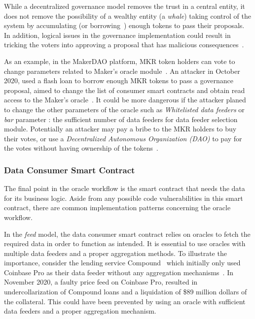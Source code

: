 While a decentralized governance model removes the trust in a central entity, it does not remove the possibility of a wealthy entity (a \emph{whale}) taking control of the system by accumulating (or borrowing~\cite{qin2020attacking}) enough tokens to pass their proposals. In addition, logical issues in the governance implementation could result in tricking the voters into approving a proposal that has malicious consequences~\cite{nexusmutualbug}. 

As an example, in the MakerDAO platform, MKR token holders can vote to change parameters related to Maker's oracle module~\cite{MAKERDAOOracle}. An attacker in October 2020, used a flash loan to borrow enough MKR tokens to pass a governance proposal, aimed to change the list of consumer smart contracts and obtain read access to the Maker's oracle~\cite{makerdaoflashloanattack}. It could be more dangerous if the attacker planed to change the other parameters of the oracle such as \textit{Whitelisted data feeders} or \textit{bar} parameter : the sufficient number of data feeders for data feeder selection module. Potentially an attacker may pay a bribe to the MKR holders to buy their votes, or use a \emph{Decentralized Autonomous Organization (DAO)} to pay for the votes without having ownership of the tokens~\cite{darkdao}.

\subsubsection{Data Consumer Smart Contract} \label{data_consumer}


The final point in the oracle workflow is the smart contract that needs the data for its business logic. Aside from any possible code vulnerabilities in this smart contract, there are common implementation patterns concerning the oracle workflow. 

In the \textit{feed} model, the data consumer smart contract relies on oracles to fetch the required data in order to function as intended. It is essential to use oracles with multiple data feeders and a proper aggregation methods. To illustrate the importance, consider the lending service Compound~\cite{compoundPriceFeed} which initially only used Coinbase Pro as their data feeder without any aggregation mechanisms~\cite{compoundcoinbasepro}. In November 2020, a faulty price feed on Coinbase Pro, resulted in undercollarization of Compound loans and a liquidation of \$89 million dollars of the collateral. This could have been prevented by using an oracle with sufficient data feeders and a proper aggregation mechanism. 

